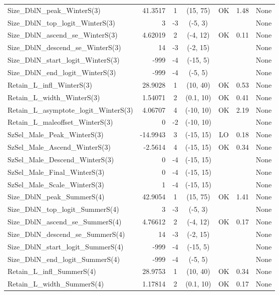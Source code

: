 \documentclass[12pt,]{article}
\begin{document}
\begin{landscape}
\begin{longtable}{lrcccll}
  Size\_DblN\_peak\_WinterS(3) & 41.3517 & 1 & (15, 75) & OK & 1.48 & None \\ 
  Size\_DblN\_top\_logit\_WinterS(3) & 3 & -3 & (-5, 3) &  &  & None \\ 
  Size\_DblN\_ascend\_se\_WinterS(3) & 4.62019 & 2 & (-4, 12) & OK & 0.11 & None \\ 
  Size\_DblN\_descend\_se\_WinterS(3) & 14 & -3 & (-2, 15) &  &  & None \\ 
  Size\_DblN\_start\_logit\_WinterS(3) & -999 & -4 & (-15, 5) &  &  & None \\ 
  Size\_DblN\_end\_logit\_WinterS(3) & -999 & -4 & (-5, 5) &  &  & None \\ 
  Retain\_L\_infl\_WinterS(3) & 28.9028 & 1 & (10, 40) & OK & 0.53 & None \\ 
  Retain\_L\_width\_WinterS(3) & 1.54071 & 2 & (0.1, 10) & OK & 0.41 & None \\ 
  Retain\_L\_asymptote\_logit\_WinterS(3) & 4.06707 & 4 & (-10, 10) & OK & 2.19 & None \\ 
  Retain\_L\_maleoffset\_WinterS(3) & 0 & -2 & (-10, 10) &  &  & None \\ 
  SzSel\_Male\_Peak\_WinterS(3) & -14.9943 & 3 & (-15, 15) & LO & 0.18 & None \\ 
  SzSel\_Male\_Ascend\_WinterS(3) & -2.5614 & 4 & (-15, 15) & OK & 0.34 & None \\ 
  SzSel\_Male\_Descend\_WinterS(3) & 0 & -4 & (-15, 15) &  &  & None \\ 
  SzSel\_Male\_Final\_WinterS(3) & 0 & -4 & (-15, 15) &  &  & None \\ 
  SzSel\_Male\_Scale\_WinterS(3) & 1 & -4 & (-15, 15) &  &  & None \\ 
  Size\_DblN\_peak\_SummerS(4) & 42.9054 & 1 & (15, 75) & OK & 1.41 & None \\ 
  Size\_DblN\_top\_logit\_SummerS(4) & 3 & -3 & (-5, 3) &  &  & None \\ 
  Size\_DblN\_ascend\_se\_SummerS(4) & 4.76612 & 2 & (-4, 12) & OK & 0.17 & None \\ 
  Size\_DblN\_descend\_se\_SummerS(4) & 14 & -3 & (-2, 15) &  &  & None \\ 
  Size\_DblN\_start\_logit\_SummerS(4) & -999 & -4 & (-15, 5) &  &  & None \\ 
  Size\_DblN\_end\_logit\_SummerS(4) & -999 & -4 & (-5, 5) &  &  & None \\ 
  Retain\_L\_infl\_SummerS(4) & 28.9753 & 1 & (10, 40) & OK & 0.34 & None \\ 
  Retain\_L\_width\_SummerS(4) & 1.17814 & 2 & (0.1, 10) & OK & 0.17 & None \\ 

\end{longtable}
\end{landscape}
\end{document}
